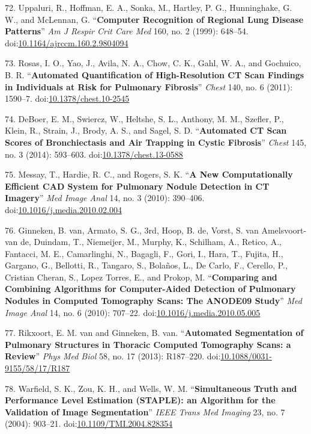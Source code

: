 \documentclass[11pt,]{article}
\begin{document}
72. Uppaluri, R., Hoffman, E. A., Sonka, M., Hartley, P. G.,
Hunninghake, G. W., and McLennan, G. ``\textbf{Computer Recognition of
Regional Lung Disease Patterns}'' \emph{Am J Respir Crit Care Med} 160,
no. 2 (1999): 648--54.
doi:\href{http://dx.doi.org/10.1164/ajrccm.160.2.9804094}{10.1164/ajrccm.160.2.9804094}

73. Rosas, I. O., Yao, J., Avila, N. A., Chow, C. K., Gahl, W. A., and
Gochuico, B. R. ``\textbf{Automated Quantification of High-Resolution CT
Scan Findings in Individuals at Risk for Pulmonary Fibrosis}''
\emph{Chest} 140, no. 6 (2011): 1590--7.
doi:\href{http://dx.doi.org/10.1378/chest.10-2545}{10.1378/chest.10-2545}

74. DeBoer, E. M., Swiercz, W., Heltshe, S. L., Anthony, M. M., Szefler,
P., Klein, R., Strain, J., Brody, A. S., and Sagel, S. D.
``\textbf{Automated CT Scan Scores of Bronchiectasis and Air Trapping in
Cystic Fibrosis}'' \emph{Chest} 145, no. 3 (2014): 593--603.
doi:\href{http://dx.doi.org/10.1378/chest.13-0588}{10.1378/chest.13-0588}

75. Messay, T., Hardie, R. C., and Rogers, S. K. ``\textbf{A New
Computationally Efficient CAD System for Pulmonary Nodule Detection in
CT Imagery}'' \emph{Med Image Anal} 14, no. 3 (2010): 390--406.
doi:\href{http://dx.doi.org/10.1016/j.media.2010.02.004}{10.1016/j.media.2010.02.004}

76. Ginneken, B. van, Armato, S. G., 3rd, Hoop, B. de, Vorst, S. van
Amelsvoort-van de, Duindam, T., Niemeijer, M., Murphy, K., Schilham, A.,
Retico, A., Fantacci, M. E., Camarlinghi, N., Bagagli, F., Gori, I.,
Hara, T., Fujita, H., Gargano, G., Bellotti, R., Tangaro, S., Bola{ñ}os,
L., De Carlo, F., Cerello, P., Cristian Cheran, S., Lopez Torres, E.,
and Prokop, M. ``\textbf{Comparing and Combining Algorithms for
Computer-Aided Detection of Pulmonary Nodules in Computed Tomography
Scans: The ANODE09 Study}'' \emph{Med Image Anal} 14, no. 6 (2010):
707--22.
doi:\href{http://dx.doi.org/10.1016/j.media.2010.05.005}{10.1016/j.media.2010.05.005}

77. Rikxoort, E. M. van and Ginneken, B. van. ``\textbf{Automated
Segmentation of Pulmonary Structures in Thoracic Computed Tomography
Scans: a Review}'' \emph{Phys Med Biol} 58, no. 17 (2013): R187--220.
doi:\href{http://dx.doi.org/10.1088/0031-9155/58/17/R187}{10.1088/0031-9155/58/17/R187}

78. Warfield, S. K., Zou, K. H., and Wells, W. M. ``\textbf{Simultaneous
Truth and Performance Level Estimation (STAPLE): an Algorithm for the
Validation of Image Segmentation}'' \emph{IEEE Trans Med Imaging} 23,
no. 7 (2004): 903--21.
doi:\href{http://dx.doi.org/10.1109/TMI.2004.828354}{10.1109/TMI.2004.828354}
\end{document}
